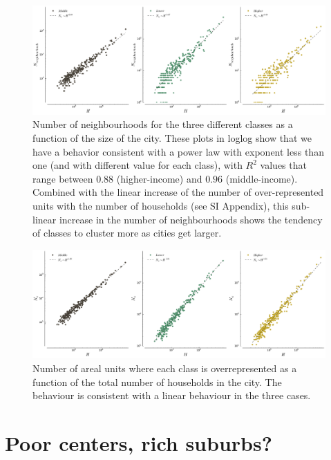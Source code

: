 \begin{figure}
    \centering
    \includegraphics[width=\textwidth]{gfx/chapter-segregation/figure7.pdf}
    \caption{Number of neighbourhoods for the three different classes as a
    function of the size of the city. These plots in loglog show that
    we have a behavior consistent with a power law with exponent less
    than one (and with different value for each class), with $R^2$ values that
    range between $0.88$ (higher-income) and $0.96$ (middle-income). Combined with the linear
    increase of the number of over-represented units with the number of
    households (see SI Appendix),
this sub-linear increase in the number of neighbourhoods shows the tendency of
classes to cluster more as cities get larger.\label{fig:number_clusters_class}}
\end{figure}

\begin{figure}
    \centering
    \includegraphics[width=\textwidth]{./gfx/chapter-segregation/number_overrepresented.pdf}
    \caption{Number of areal units where each class is overrepresented as a
    function of the total number of households in the city. The behaviour is
consistent with a linear behaviour in the three cases.
\label{fig:overrepresented}}
\end{figure}


\section{Poor centers, rich suburbs?}
\label{sec:poor_centers_rich_suburbs_}

